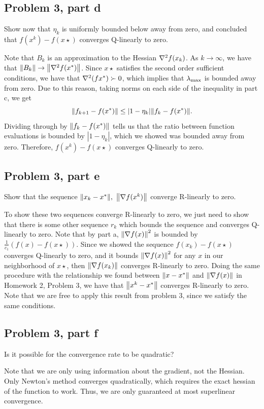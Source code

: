 \subsection{Problem 3, part d}
Show now that $\eta_k$ is uniformly bounded below away from zero, and concluded that $f(x^k) - f(x\star)$ converges Q-linearly to zero.
\partbreak
\begin{solution}

    Note that $B_k$ is an approximation to the Hessian $\nabla^2f(x_k)$. As $k\rightarrow \infty$, we have that $\norm{B_k} \rightarrow \norm{\nabla^2f(x^{*})}$. Since $x\star$ satisfies the second order sufficient conditions, we have that $\nabla^2(fx^{*}) \succ 0$, which implies that $\mathrm{\lambda}_{\max}$ is bounded away from zero. Due to this reason, taking norms on each side of the inequality in part c, we get
    \[\norm{f_{k+1} - f(x^{*})} \leq |1 - \eta_k|\norm{f_k - f(x^{*})}.\]
    Dividing through by $\norm{f_k - f(x^{*})}$ tells us that the ratio between function evaluations is bounded by $|1 - \eta_k|$, which we showed was bounded away from zero. Therefore, $f(x^k) - f(x\star)$ converges Q-linearly to zero.  
\end{solution}

\subsection{Problem 3, part e}
Show that the sequence $\norm{x_k - x^{*}}, \ \norm{\nabla f(x^k)}$ converge R-linearly to zero. 
\partbreak
\begin{solution}

    To show these two sequences converge R-linearly to zero, we just need to show that there is some other sequence $r_k$ which bounds the sequence and converges Q-linearly to zero. Note that by part a, $\norm{\nabla f(x)}^2$ is bounded by $\frac{1}{c_1} (f(x) - f(x\star))$. Since we showed the sequence $f(x_k) - f(x\star)$ converges Q-linearly to zero, and it bounds $\norm{\nabla f(x)}^2$ for any $x$ in our neighborhood of $x\star$, then $\norm{\nabla f(x_k)}$ converges R-linearly to zero. Doing the same procedure with the relationship we found between $\norm{x - x^{*}}$ and $\norm{\nabla f(x)}$ in Homework 2, Problem 3, we have that $\norm{x^k - x^{*}}$ converges R-linearly to zero. Note that we are free to apply this result from problem 3, since we satisfy the same conditions. 
\end{solution}

\newpage
\subsection{Problem 3, part f}
Is it possible for the convergence rate to be quadratic?
\partbreak
\begin{solution}

    Note that we are only using information about the gradient, not the Hessian. Only Newton's method converges quadratically, which requires the exact hessian of the function to work. Thus, we are only guaranteed at most superlinear convergence.  
\end{solution}

